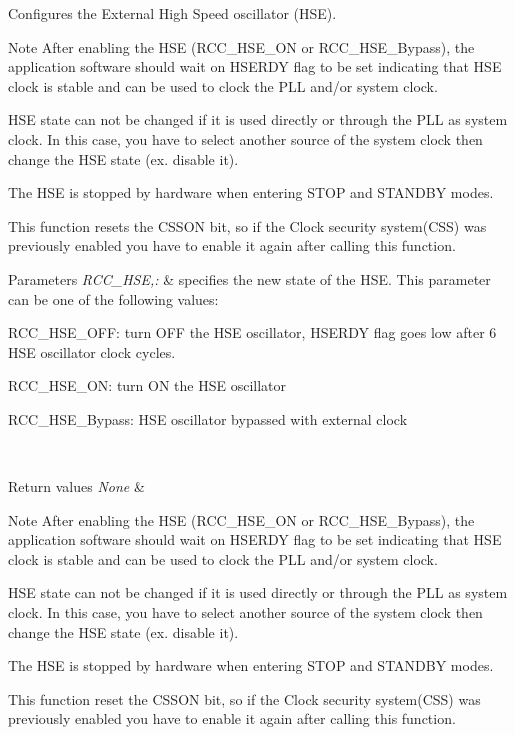 Configures the External High Speed oscillator (H\-S\-E). 

\begin{DoxyNote}{Note}
After enabling the H\-S\-E (R\-C\-C\-\_\-\-H\-S\-E\-\_\-\-O\-N or R\-C\-C\-\_\-\-H\-S\-E\-\_\-\-Bypass), the application software should wait on H\-S\-E\-R\-D\-Y flag to be set indicating that H\-S\-E clock is stable and can be used to clock the P\-L\-L and/or system clock. 

H\-S\-E state can not be changed if it is used directly or through the P\-L\-L as system clock. In this case, you have to select another source of the system clock then change the H\-S\-E state (ex. disable it). 

The H\-S\-E is stopped by hardware when entering S\-T\-O\-P and S\-T\-A\-N\-D\-B\-Y modes. 

This function resets the C\-S\-S\-O\-N bit, so if the Clock security system(\-C\-S\-S) was previously enabled you have to enable it again after calling this function. 
\end{DoxyNote}

\begin{DoxyParams}{Parameters}
{\em R\-C\-C\-\_\-\-H\-S\-E,\-:} & specifies the new state of the H\-S\-E. This parameter can be one of the following values\-: \begin{DoxyItemize}
\item R\-C\-C\-\_\-\-H\-S\-E\-\_\-\-O\-F\-F\-: turn O\-F\-F the H\-S\-E oscillator, H\-S\-E\-R\-D\-Y flag goes low after 6 H\-S\-E oscillator clock cycles. \item R\-C\-C\-\_\-\-H\-S\-E\-\_\-\-O\-N\-: turn O\-N the H\-S\-E oscillator \item R\-C\-C\-\_\-\-H\-S\-E\-\_\-\-Bypass\-: H\-S\-E oscillator bypassed with external clock \end{DoxyItemize}
\\
\hline
\end{DoxyParams}

\begin{DoxyRetVals}{Return values}
{\em None} & \\
\hline
\end{DoxyRetVals}
\begin{DoxyNote}{Note}
After enabling the H\-S\-E (R\-C\-C\-\_\-\-H\-S\-E\-\_\-\-O\-N or R\-C\-C\-\_\-\-H\-S\-E\-\_\-\-Bypass), the application software should wait on H\-S\-E\-R\-D\-Y flag to be set indicating that H\-S\-E clock is stable and can be used to clock the P\-L\-L and/or system clock. 

H\-S\-E state can not be changed if it is used directly or through the P\-L\-L as system clock. In this case, you have to select another source of the system clock then change the H\-S\-E state (ex. disable it). 

The H\-S\-E is stopped by hardware when entering S\-T\-O\-P and S\-T\-A\-N\-D\-B\-Y modes. 

This function reset the C\-S\-S\-O\-N bit, so if the Clock security system(\-C\-S\-S) was previously enabled you have to enable it again after calling this function. 
\end{DoxyNote}

